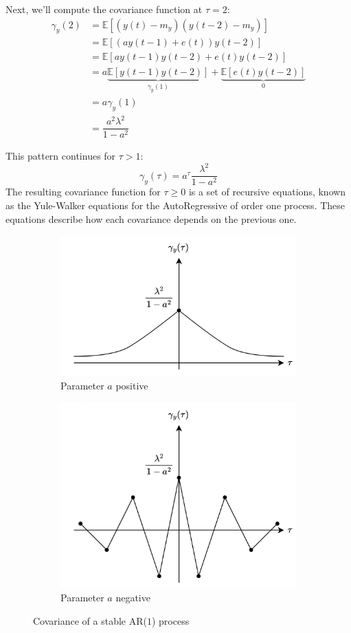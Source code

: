 Next, we'll compute the covariance function at $\tau=2$:
\begin{align*}
    \gamma_y(2) &=\mathbb{E}\left[ \left(y(t)-m_y\right)\left(y(t-2)-m_y\right) \right] \\
                &=\mathbb{E}\left[ \left(ay(t-1)+e(t)\right)y(t-2) \right] \\
                &=\mathbb{E}\left[ ay(t-1)y(t-2)+e(t)y(t-2) \right] \\     
                &=a\underbrace{\mathbb{E}\left[ y(t-1)y(t-2)\right]}_{\gamma_y(1)} +\underbrace{\mathbb{E}\left[e(t)y(t-2) \right]}_0  \\  
                &=a\gamma_y(1) \\                 
                &=\dfrac{a^2\lambda^2}{1-a^2}
\end{align*}

This pattern continues for $\tau > 1$:
\[\gamma_y(\tau)=a^\tau\dfrac{\lambda^2}{1-a^2}\]
The resulting covariance function for $\tau \geq 0$ is a set of recursive equations, known as the Yule-Walker equations for the AutoRegressive of order one process. 
These equations describe how each covariance depends on the previous one.
\begin{figure}[H]
    \centering
    \begin{subfigure}{0.49\textwidth}
        \centering
        \includegraphics[width=0.85\linewidth]{images/ar1.png} 
        \caption{Parameter $a$ positive}
    \end{subfigure}
    \begin{subfigure}{0.49\textwidth}
        \centering
        \includegraphics[width=0.75\linewidth]{images/ar2.png}
        \caption{Parameter $a$ negative}
    \end{subfigure}
    \caption{Covariance of a stable AR($1$) process}
\end{figure}

